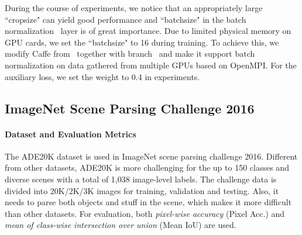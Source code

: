 \documentclass[10pt,twocolumn,letterpaper]{article}
\begin{document}
During the course of experiments, we notice that an appropriately large ``cropsize" can
yield good performance and ``batchsize" in the batch normalization~\cite{ioffe2015batch}
layer is of great importance. Due to limited physical memory on GPU cards, we set the
``batchsize" to 16 during training. To achieve this, we modify Caffe
from~\cite{wang2015towards} together with branch~\cite{chen2016deeplab} and make it
support batch normalization on data gathered from multiple GPUs based on OpenMPI. For the
auxiliary loss, we set the weight to 0.4 in experiments.

\subsection{ImageNet Scene Parsing Challenge 2016}
\label{sec:imagenetexperimet}

\paragraph{Dataset and Evaluation Metrics}
The ADE20K dataset \cite{zhou2016semantic} is used in ImageNet scene parsing challenge
2016. Different from other datasets, ADE20K is more challenging for the up to 150 classes
and diverse scenes with a total of 1,038 image-level labels. The challenge data is
divided into 20K/2K/3K images for training, validation and testing. Also, it needs to
parse both objects and stuff in the scene, which makes it more difficult than other
datasets. For evaluation, both {\it pixel-wise accuracy} (Pixel Acc.) and {\it mean of
class-wise intersection over union} (Mean IoU) are used.
\end{document}
